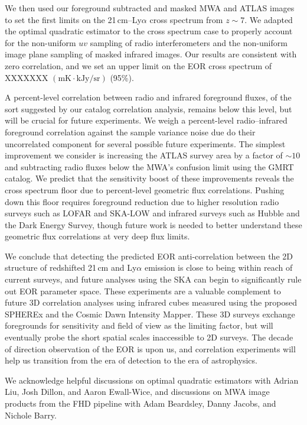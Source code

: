 \documentclass[numberedappendix]{emulateapj}
\begin{document}
We then used our foreground subtracted and masked MWA and ATLAS images to set the first limits on the 21\,cm--Ly$\alpha$ cross spectrum from $z\sim7$. We adapted the optimal quadratic estimator to the cross spectrum case to properly account for the non-uniform $uv$ sampling of radio interferometers and the non-uniform image plane sampling of masked infrared images. Our results are consistent with zero correlation, and we set an upper limit on the EOR cross spectrum of XXXXXXX $(\text{mK}\cdot \text{kJy/sr})$ (95\%). 

A percent-level correlation between radio and infrared foreground fluxes, of the sort suggested by our catalog correlation analysis, remains below this level, but will be crucial for future experiments. We weigh a percent-level radio--infrared foreground correlation against the sample variance noise due do their uncorrelated component for several possible future experiments. The simplest improvement we consider is increasing the ATLAS survey area by a factor of $\sim10$ and subtracting radio fluxes below the MWA's confusion limit using the GMRT catalog. We predict that the sensitivity boost of these improvements reveals the cross spectrum floor due to percent-level geometric flux correlations. Pushing down this floor requires foreground reduction due to higher resolution radio surveys such as LOFAR and SKA-LOW and infrared surveys such as Hubble and the Dark Energy Survey, though future work is needed to better understand these geometric flux correlations at very deep flux limits.

We conclude that detecting the predicted EOR anti-correlation between the 2D structure of redshifted 21\,cm and Ly$\alpha$ emission is close to being within reach of current surveys, and future analyses using the SKA can begin to significantly rule out EOR parameter space. These experiments are a valuable complement to future 3D correlation analyses using infrared cubes measured using the proposed SPHEREx and the Cosmic Dawn Intensity Mapper. These 3D surveys exchange foregrounds for sensitivity and field of view as the limiting factor, but will eventually probe the short spatial scales inaccessible to 2D surveys. The decade of direction observation of the EOR is upon us, and correlation experiments will help us transition from the era of detection to the era of astrophysics.

\begin{acknowledgments}
We acknowledge helpful discussions on optimal quadratic estimators with Adrian Liu, Josh Dillon, and Aaron Ewall-Wice, and discussions on MWA image products from the FHD pipeline with Adam Beardsley, Danny Jacobs, and Nichole Barry. 
\end{acknowledgments}
\end{document}
